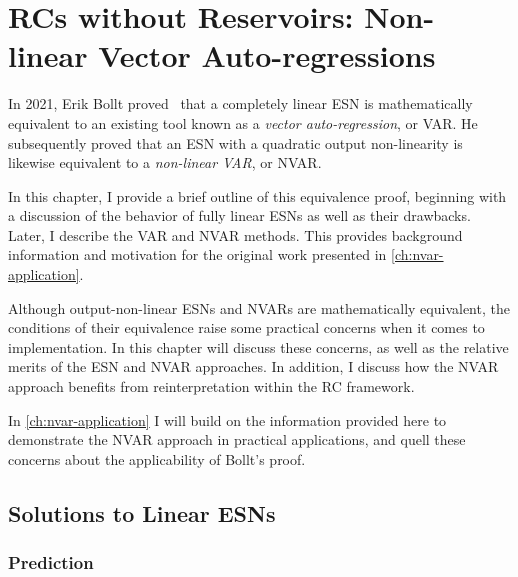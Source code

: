 \chapter{RCs without Reservoirs: Non-linear Vector Auto-regressions}\label{ch:nvar}

In 2021, Erik Bollt proved~\cite{bollt2021} that a completely linear
ESN is mathematically equivalent to an existing tool known as a \emph{vector
auto-regression}, or VAR. He subsequently proved that an ESN with a
quadratic output non-linearity is likewise equivalent to a
\emph{non-linear VAR}, or NVAR.

In this chapter, I provide a brief outline of this equivalence proof,
beginning with a discussion of the behavior of fully linear ESNs as
well as their drawbacks. Later, I describe the VAR and NVAR
methods. This provides background information and motivation for the
original work presented in \cref{ch:nvar-application}.

Although output-non-linear ESNs and NVARs are mathematically
equivalent, the conditions of their equivalence raise some practical
concerns when it comes to implementation. In this chapter will discuss
these concerns, as well as the relative merits of the ESN and NVAR
approaches. In addition, I discuss how the NVAR approach benefits from
reinterpretation within the RC framework.

In \cref{ch:nvar-application} I will build on the information provided
here to demonstrate the NVAR approach in practical applications, and
quell these concerns about the applicability of Bollt's proof.

\section{Solutions to Linear ESNs}

\subsection{Prediction}

